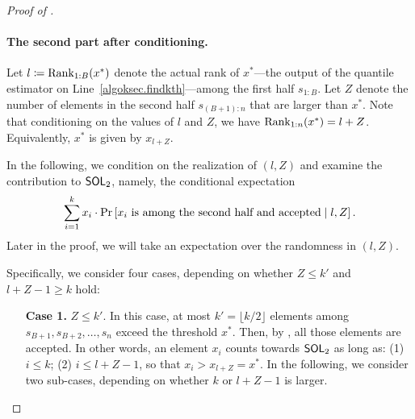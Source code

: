\begin{proof}[Proof of ]
\paragraph{The second part after conditioning.} Let $l\coloneqq\mathrm{Rank}_{1:B} (x^*)$ denote the actual rank of $x^*$---the output of the quantile estimator on Line~\ref{algoksec.findkth}---among the first half $s_{1:B}$. Let $Z$ denote the number of elements in the second half $s_{(B+1):n}$ that are larger than $x^*$. Note that conditioning on the values of $l$ and $Z$, we have $\mathrm{Rank}_{1:n}(x^*) = l + Z$. Equivalently, $x^*$ is given by $x_{l+Z}$.

In the following, we condition on the realization of $(l, Z)$ and examine the contribution to $\mathsf{SOL}_2$, namely, the conditional expectation
\[
    \sum_{i=1}^{k}x_i\cdot\Pr_{}\left[x_i\text{ is among the second half and accepted} \mid l, Z\right].
\]
Later in the proof, we will take an expectation over the randomness in $(l, Z)$. 

Specifically, we consider four cases, depending on whether $Z \le k'$ and $l + Z - 1 \ge k$ hold:
\begin{enumerate}
    \item[\textbf{Case 1.}] $Z \le k'$. In this case, at most $k' = \lfloor k/2\rfloor$ elements among $s_{B+1}, s_{B+2}, \ldots, s_n$ exceed the threshold $x^*$. Then, by , all those elements are accepted. In other words, an element $x_i$ counts towards $\mathsf{SOL}_2$ as long as: (1) $i \le k$; (2) $i \le l + Z - 1$, so that $x_i > x_{l+Z} = x^*$. In the following, we consider two sub-cases, depending on whether $k$ or $l + Z - 1$ is larger.


\end{enumerate}
\end{proof}
